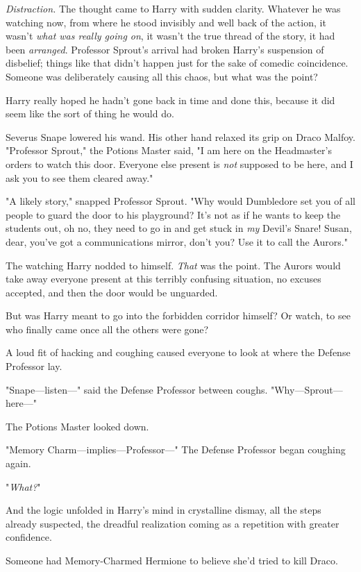\emph{Distraction.} The thought came to Harry with sudden clarity. Whatever he
was watching now, from where he stood invisibly and well back of the action, it
wasn't \emph{what was really going on}, it wasn't the true thread of the story,
it had been \emph{arranged}. Professor Sprout's arrival had broken Harry's
suspension of disbelief; things like that didn't happen just for the sake of
comedic coincidence. Someone was deliberately causing all this chaos, but what
was the point?

Harry really hoped he hadn't gone back in time and done this, because it did
seem like the sort of thing he would do.

Severus Snape lowered his wand. His other hand relaxed its grip on Draco Malfoy.
"Professor Sprout," the Potions Master said, "I am here on the Headmaster's
orders to watch this door. Everyone else present is \emph{not} supposed to be
here, and I ask you to see them cleared away."

"A likely story," snapped Professor Sprout. "Why would Dumbledore set you of
all people to guard the door to his playground? It's not as if he wants to keep
the students out, oh no, they need to go in and get stuck in \emph{my} Devil's
Snare! Susan, dear, you've got a communications mirror, don't you? Use it to
call the Aurors."

The watching Harry nodded to himself. \emph{That} was the point. The Aurors
would take away everyone present at this terribly confusing situation, no
excuses accepted, and then the door would be unguarded.

But was Harry meant to go into the forbidden corridor himself? Or watch, to see
who finally came once all the others were gone?

A loud fit of hacking and coughing caused everyone to look at where the Defense
Professor lay.

"Snape---listen\mbox{---}" said the Defense Professor between coughs.
"Why---Sprout---here\mbox{---}"

The Potions Master looked down.

"Memory Charm---implies---Professor\mbox{---}" The Defense Professor began coughing
again.

"\emph{What?}"

And the logic unfolded in Harry's mind in crystalline dismay, all the steps
already suspected, the dreadful realization coming as a repetition with greater
confidence.

Someone had Memory-Charmed Hermione to believe she'd tried to kill Draco.

